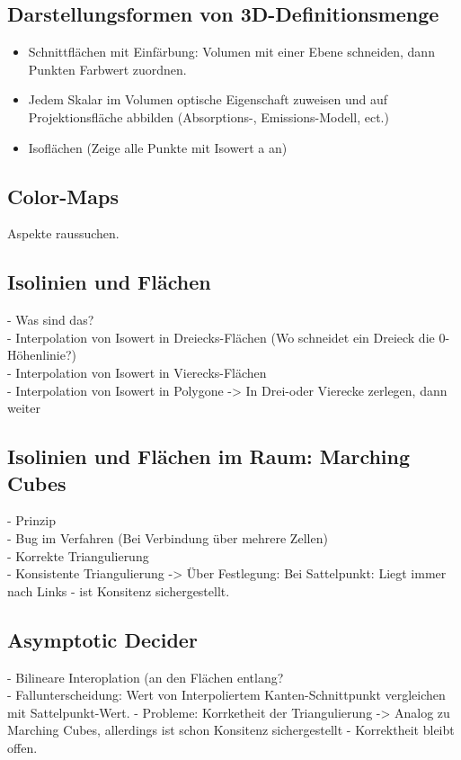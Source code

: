 \documentclass{article}
\begin{document}
\subsection{Darstellungsformen von 3D-Definitionsmenge}
\begin{itemize}[noitemsep]
	\item Schnittflächen mit Einfärbung: Volumen mit einer Ebene schneiden, dann Punkten Farbwert zuordnen.
	\item Jedem Skalar im Volumen optische Eigenschaft zuweisen und auf Projektionsfläche abbilden (Absorptions-, Emissions-Modell, ect.)
	\item Isoflächen (Zeige alle Punkte mit Isowert a an)
\end{itemize}

\subsection{Color-Maps}
Aspekte raussuchen.

\subsection{Isolinien und Flächen}
- Was sind das?\\
- Interpolation von Isowert in Dreiecks-Flächen (Wo schneidet ein Dreieck die 0-Höhenlinie?)\\
- Interpolation von Isowert in Vierecks-Flächen\\
- Interpolation von Isowert in Polygone -> In Drei-oder Vierecke zerlegen, dann weiter\\

\subsection{Isolinien und Flächen im Raum: Marching Cubes}
- Prinzip\\
- Bug im Verfahren (Bei Verbindung über mehrere Zellen)\\
- Korrekte Triangulierung\\ 
- Konsistente Triangulierung -> Über Festlegung: Bei Sattelpunkt: Liegt immer nach Links - ist Konsitenz sichergestellt.

\subsection{Asymptotic Decider}
- Bilineare Interoplation (an den Flächen entlang?\\
- Fallunterscheidung: Wert von Interpoliertem Kanten-Schnittpunkt vergleichen mit Sattelpunkt-Wert.
- Probleme: Korrketheit der Triangulierung -> Analog zu Marching Cubes, allerdings ist schon Konsitenz sichergestellt - Korrektheit bleibt offen.\\
\end{document}
